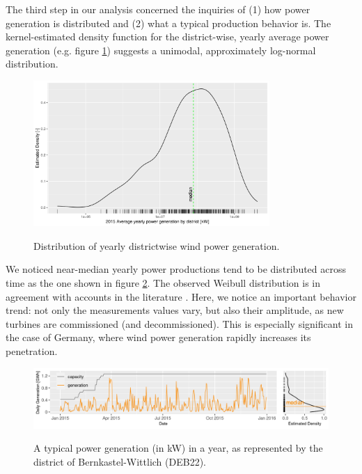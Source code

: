 \newpage
The third step in our analysis concerned the inquiries of (1) how power generation is distributed and (2) what a typical production behavior is.
The kernel-estimated density function for the district-wise, yearly average power generation (e.g. figure \ref{fig:yearly_power_generation}) suggests a unimodal, approximately log-normal distribution.

\begin{figure}[H]%
   \centering
    \caption{Distribution of yearly districtwise wind power generation.}
    \includegraphics[width=0.8\textwidth]{power-generated-yearly-distribution}
   \label{fig:yearly_power_generation}
\end{figure}

We noticed near-median yearly power productions tend to be distributed across time as the one shown in figure \ref{fig:deb22_production_2015}.
The observed Weibull distribution is in agreement with accounts in the literature \cite{blaabjerg2017electronics, engeland2017variability, he2014short-term}.
Here, we notice an important behavior trend: not only the measurements values vary, but also their amplitude, as new turbines are commissioned (and decommissioned).
This is especially significant in the case of Germany, where wind power generation rapidly increases its penetration.

\begin{figure}[H]%
   \centering
    \caption{A typical power generation (in kW) in a year, as represented by the district of Bernkastel-Wittlich (DEB22).}
    \includegraphics[width=\textwidth]{wpg-daily-typical-ts_20200701_155716_fav.png}
   \label{fig:deb22_production_2015}
\end{figure}

